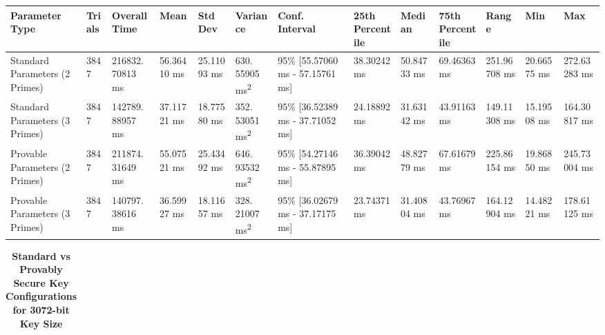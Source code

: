 \documentclass[]{final_report}
\theoremstyle{definition}
\begin{document}
\begin{landscape}
\begin{table}[H]
\begin{tabular}{|p{2.5cm}|p{1cm}|p{1.5cm}|p{1.5cm}|p{1.3cm}|p{1.5cm}|p{2.5cm}|p{1.5cm}|p{1.5cm}|p{1.5cm}|p{1.5cm}|p{1.5cm}|p{1.6cm}|}
\hline
\textbf{Parameter Type} & \textbf{Trials} & \textbf{Overall Time} & \textbf{Mean} & \textbf{Std Dev} & \textbf{Variance} & \textbf{Conf. Interval} & \textbf{25th Percentile} & \textbf{Median} & \textbf{75th Percentile} & \textbf{Range} & \textbf{Min} & \textbf{Max} \\
\hline
Standard Parameters (2 Primes) & 3847 & 216832.
70813 ms & 56.36410 ms & 25.11093 ms & 630.
55905 ms\textsuperscript{2} & 95\% [55.57060 ms - 57.15761 ms] & 38.30242 ms & 50.84733 ms & 69.46363 ms & 251.96708 ms & 20.66575 ms & 272.63283 ms \\
\hline
Standard Parameters (3 Primes) & 3847 & 142789.
88957 ms & 37.11721 ms & 18.77580 ms & 352.
53051 ms\textsuperscript{2} & 95\% [36.52389 ms - 37.71052 ms] & 24.18892 ms & 31.63142 ms & 43.91163 ms & 149.11308 ms & 15.19508 ms & 164.30817 ms \\
\hline
Provable Parameters (2 Primes) & 3847 & 211874.
31649 ms & 55.07521 ms & 25.43492 ms & 646.
93532 ms\textsuperscript{2} & 95\% [54.27146 ms - 55.87895 ms] & 36.39042 ms & 48.82779 ms & 67.61679 ms & 225.86154 ms & 19.86850 ms & 245.73004 ms \\
\hline
Provable Parameters (3 Primes) & 3847 & 140797.
38616 ms & 36.59927 ms & 18.11657 ms & 328.
21007 ms\textsuperscript{2} & 95\% [36.02679 ms - 37.17175 ms] & 23.74371 ms & 31.40804 ms & 43.76967 ms & 164.12904 ms & 14.48221 ms & 178.61125 ms \\
\hline
\end{tabular}
\label{keyGen_2048bit_table}
\end{table}
\begin{table}[H]
\caption{\textbf{Standard vs Provably Secure Key Configurations for 3072-bit Key Size}}
\centering

\begin{tabular}{|p{2.5cm}|p{1cm}|p{1.5cm}|p{1.5cm}|p{1.3cm}|p{1.5cm}|p{2.5cm}|p{1.5cm}|p{1.5cm}|p{1.5cm}|p{1.5cm}|p{1.5cm}|p{1.6cm}|}


\end{tabular}
\end{table}
\end{landscape}
\end{document}
